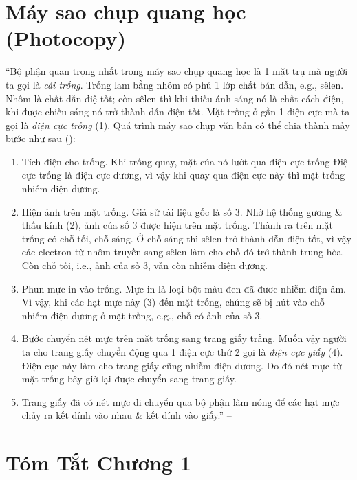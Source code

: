 \documentclass[oneside]{book}
\numberwithin{equation}{section}
\begin{document}
\section{Máy sao chụp quang học (Photocopy)}
``Bộ phận quan trọng nhất trong máy sao chụp quang học là 1 mặt trụ mà người ta gọi là \textit{cái trống}. Trống lam bằng nhôm có phủ 1 lớp chất bán dẫn, e.g., sêlen. Nhôm là chất dẫn điệ tốt; còn sêlen thì khi thiếu ánh sáng nó là chất cách điện, khi được chiếu sáng nó trở thành dẫn điện tốt. Mặt trống ở gần 1 điện cực mà ta gọi là \textit{điện cực trống} (1). Quá trình máy sao chụp văn bản có thể chia thành mấy bước như sau (\cite[Hình 9.1, p. 44]{SGK_Vat_Ly_11_nang_cao}):
\begin{enumerate}
	\item Tích điện cho trống. Khi trống quay, mặt của nó lướt qua điện cực trống Điệ cực trống là điện cực dương, vì vậy khi quay qua điện cực này thì mặt trống nhiễm điện dương.
	\item Hiện ảnh trên mặt trống. Giả sử tài liệu gốc là số 3. Nhờ hệ thống gương \& thấu kính (2), ảnh của số 3 được hiện trên mặt trống. Thành ra trên mặt trống có chỗ tối, chỗ sáng. Ở chỗ sáng thì sêlen trở thành dẫn điện tốt, vì vậy các electron từ nhôm truyền sang sêlen làm cho chỗ đó trở thành trung hòa. Còn chỗ tối, i.e., ảnh của số 3, vẫn còn nhiễm điện dương.
	\item Phun mực in vào trống. Mực in là loại bột màu đen đã đươc nhiễm điện âm. Vì vậy, khi các hạt mực này (3) đến mặt trống, chúng sẽ bị hút vào chỗ nhiễm điện dương ở mặt trống, e.g., chỗ có ảnh của số 3.
	\item Bước chuyển nét mực trên mặt trống sang trang giấy trắng. Muốn vậy người ta cho trang giấy chuyển động qua 1 điện cực thứ 2 gọi là \textit{điện cực giấy} (4). Điện cực này làm cho trang giấy cũng nhiễm điện dương. Do đó nét mực từ mặt trống bây giờ lại được chuyển sang trang giấy.
	\item Trang giấy đã có nét mực di chuyển qua bộ phận làm nóng để các hạt mực chảy ra kết dính vào nhau \& kết dính vào giấy.'' -- \cite[p. 44]{SGK_Vat_Ly_11_nang_cao}
\end{enumerate}

\section{Tóm Tắt Chương 1}

\end{document}
